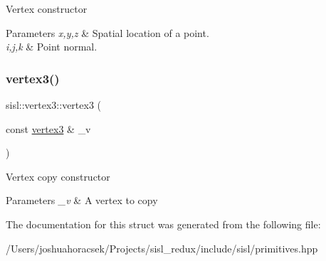 Vertex constructor 
\begin{DoxyParams}{Parameters}
{\em x,y,z} & Spatial location of a point. \\
\hline
{\em i,j,k} & Point normal. \\
\hline
\end{DoxyParams}
\mbox{\label{structsisl_1_1vertex3_a689f16f717542968ed5ba74129866228}} 
\subsubsection{\texorpdfstring{vertex3()}{vertex3()}\hspace{0.1cm}{\footnotesize\ttfamily [3/3]}}
{\footnotesize\ttfamily sisl\+::vertex3\+::vertex3 (\begin{DoxyParamCaption}\item[{const \hyperlink{structsisl_1_1vertex3}{vertex3} \&}]{\+\_\+v }\end{DoxyParamCaption})\hspace{0.3cm}{\ttfamily [inline]}}

Vertex copy constructor 
\begin{DoxyParams}{Parameters}
{\em \+\_\+v} & A vertex to copy \\
\hline
\end{DoxyParams}


The documentation for this struct was generated from the following file\+:\begin{DoxyCompactItemize}
\item 
/\+Users/joshuahoracsek/\+Projects/sisl\+\_\+redux/include/sisl/primitives.\+hpp\end{DoxyCompactItemize}

